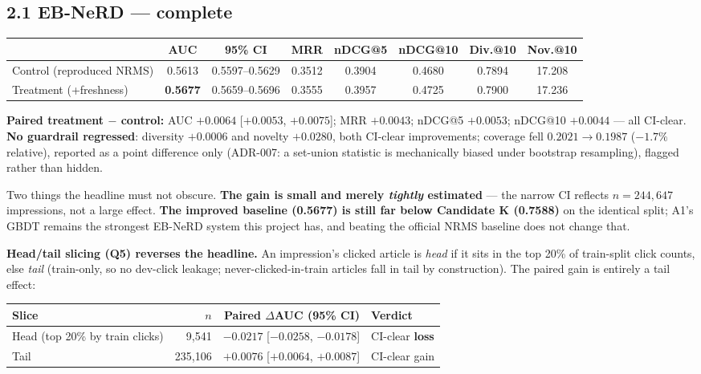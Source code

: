\documentclass[11pt]{article}
\begin{document}
\subsection*{2.1 EB-NeRD --- complete}

\begin{center}
{\footnotesize
\begin{tabular}{@{}lccccccc@{}}
\toprule
& AUC & 95\% CI & MRR & nDCG@5 & nDCG@10 & Div.@10 & Nov.@10 \\
\midrule
Control (reproduced NRMS) & 0.5613 & 0.5597--0.5629 & 0.3512 & 0.3904 & 0.4680 & 0.7894 & 17.208 \\
Treatment (+freshness) & \textbf{0.5677} & 0.5659--0.5696 & 0.3555 & 0.3957 & 0.4725 & 0.7900 & 17.236 \\
\bottomrule
\end{tabular}\par}
\end{center}

\textbf{Paired treatment $-$ control:} AUC $+0.0064$ [$+0.0053$, $+0.0075$]; MRR
$+0.0043$; nDCG@5 $+0.0053$; nDCG@10 $+0.0044$ --- all CI-clear. \textbf{No guardrail
regressed}: diversity $+0.0006$ and novelty $+0.0280$, both CI-clear improvements;
coverage fell $0.2021\to0.1987$ ($-1.7\%$ relative), reported as a point difference
only (ADR-007: a set-union statistic is mechanically biased under bootstrap
resampling), flagged rather than hidden.

Two things the headline must not obscure. \textbf{The gain is small and merely
\emph{tightly} estimated} --- the narrow CI reflects $n=244{,}647$ impressions, not
a large effect. \textbf{The improved baseline (0.5677) is still far below Candidate
K (0.7588)} on the identical split; A1's GBDT remains the strongest EB-NeRD system
this project has, and beating the official NRMS baseline does not change that.

\textbf{Head/tail slicing (Q5) reverses the headline.} An impression's clicked
article is \emph{head} if it sits in the top 20\% of train-split click counts,
else \emph{tail} (train-only, so no dev-click leakage; never-clicked-in-train
articles fall in tail by construction). The paired gain is entirely a tail effect:

\begin{center}
{\footnotesize
\begin{tabular}{@{}lrrl@{}}
\toprule
Slice & $n$ & Paired $\Delta$AUC (95\% CI) & Verdict \\
\midrule
Head (top 20\% by train clicks) & 9{,}541 & $-0.0217$ [$-0.0258$, $-0.0178$] & CI-clear \textbf{loss} \\
Tail & 235{,}106 & $+0.0076$ [$+0.0064$, $+0.0087$] & CI-clear gain \\
\bottomrule
\end{tabular}\par}
\end{center}
\end{document}
